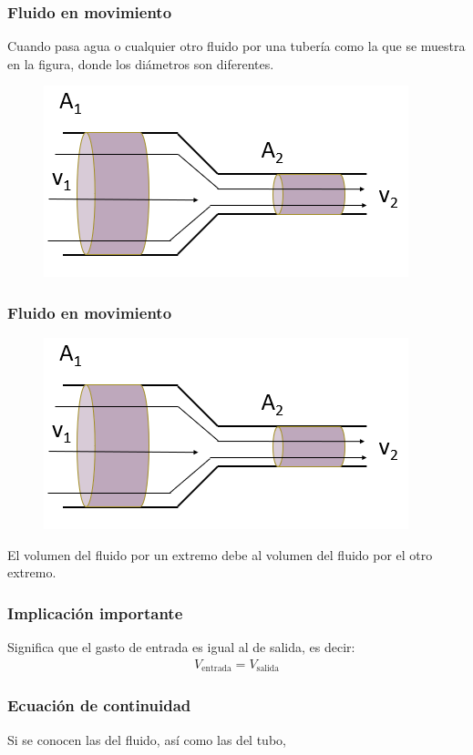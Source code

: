 \documentclass[14pt]{beamer}
\begin{document}
\begin{frame}
\frametitle{Fluido en movimiento}
\vspace*{-0.5cm}
Cuando pasa agua o cualquier otro fluido por una tubería como la que se muestra en la figura, donde los diámetros son diferentes.
\begin{figure}
    \centering
    \includegraphics[scale=0.65]{Imagenes/Continuidad_01.png}
\end{figure}
\end{frame}
\begin{frame}
\frametitle{Fluido en movimiento}
\vspace*{-0.75cm}
\begin{figure}
    \centering
    \includegraphics[scale=0.65]{Imagenes/Continuidad_01.png}
\end{figure}
El volumen del fluido  por un extremo debe  al volumen del fluido  por el otro extremo.
\end{frame}
\begin{frame}
\frametitle{Implicación importante}
Significa que el gasto de entrada es igual al de salida, es decir:
\pause
\begin{align*}
V_{\text{entrada}} = V_{\text{salida}}
\end{align*}
\end{frame}
\begin{frame}
\frametitle{Ecuación de continuidad}
Si se conocen las  del fluido, \pause así como las  del tubo,
\end{frame}
\end{document}
